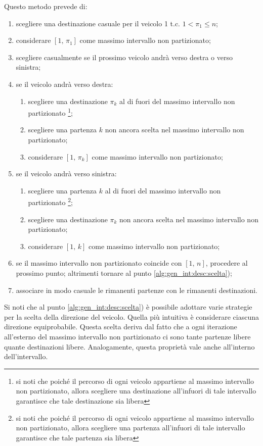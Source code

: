 \documentclass[../../main.tex]{subfiles}
\begin{document}
Questo metodo prevede di:
\begin{enumerate}
    \item scegliere una destinazione casuale per il veicolo 1 t.c. $1 < \pi_1 \leq n$;
    \item considerare $[1,\, \pi_1]$ come massimo intervallo non partizionato;
    \item scegliere casualmente se il prossimo veicolo andrà verso destra o verso sinistra;
    \label{alg:gen_int:desc:scelta}
    \item se il veicolo andrà verso destra:
    \begin{enumerate}
        \item scegliere una destinazione $\pi_k$ al di fuori del massimo intervallo non partizionato
        \footnote{si noti che poiché il percorso di ogni veicolo appartiene al massimo intervallo non partizionato, allora scegliere una destinazione all'infuori di tale intervallo garantisce che tale destinazione sia libera};
        \item scegliere una partenza $k$ non ancora scelta nel massimo intervallo non partizionato;
        \item considerare $[1,\, \pi_k]$ come massimo intervallo non partizionato;
    \end{enumerate}
    \item se il veicolo andrà verso sinistra:
    \begin{enumerate}
        \item scegliere una partenza $k$ al di fuori del massimo intervallo non partizionato
        \footnote{si noti che poiché il percorso di ogni veicolo appartiene al massimo intervallo non partizionato, allora scegliere una partenza all'infuori di tale intervallo garantisce che tale partenza sia libera};
        \item scegliere una destinazione $\pi_k$ non ancora scelta nel massimo intervallo non partizionato;
        \item considerare $[1,\, k]$ come massimo intervallo non partizionato;
    \end{enumerate}
    \item se il massimo intervallo non partizionato coincide con $[1,\, n]$, procedere al prossimo punto;
    altrimenti tornare al punto \ref{alg:gen_int:desc:scelta});
    \item associare in modo casuale le rimanenti partenze con le rimanenti destinazioni.
\end{enumerate}

Si noti che al punto \ref{alg:gen_int:desc:scelta}) è possibile adottare varie strategie per la scelta della direzione del veicolo.
Quella più intuitiva è considerare ciascuna direzione equiprobabile.
Questa scelta deriva dal fatto che a ogni iterazione all'esterno del massimo intervallo non partizionato ci sono tante partenze libere quante destinazioni libere.
Analogamente, questa proprietà vale anche all'interno dell'intervallo.
\end{document}
